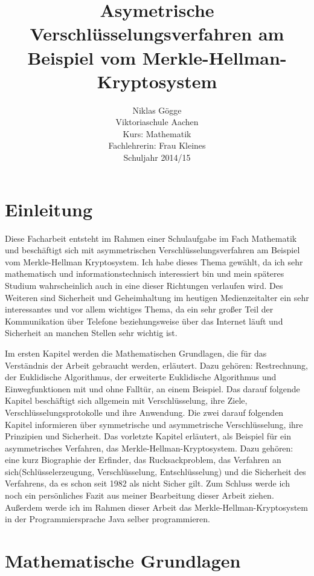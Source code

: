 \documentclass[a4paper,12pt,titlepage]{article}
\author
{
Niklas Gögge\\
Viktoriaschule Aachen\\
Kurs: Mathematik\\
Fachlehrerin: Frau Kleines\\
Schuljahr 2014/15
}
\begin{document}
\title{Asymetrische Verschlüsselungsverfahren am Beispiel vom Merkle-Hellman-Kryptosystem}
\maketitle

\newpage
\tableofcontents
\newpage

\section{Einleitung}
Diese Facharbeit entsteht im Rahmen einer Schulaufgabe im Fach Mathematik und
beschäftigt sich mit asymmetrischen Verschlüsselungsverfahren am Beispiel vom
Merkle-Hellman Kryptosystem. Ich habe dieses Thema gewählt, da ich sehr
mathematisch und informationstechnisch interessiert bin und mein späteres
Studium wahrscheinlich auch in eine dieser Richtungen verlaufen wird. Des
Weiteren sind Sicherheit und Geheimhaltung im heutigen Medienzeitalter ein sehr
interessantes und vor allem wichtiges Thema, da ein sehr großer Teil der
Kommunikation über Telefone beziehungsweise über das Internet läuft und
Sicherheit an manchen Stellen sehr wichtig ist.

Im ersten Kapitel werden die Mathematischen Grundlagen, die für das Verständnis
der Arbeit gebraucht werden, erläutert. Dazu gehören: Restrechnung, der Euklidische
Algorithmus, der erweiterte Euklidische Algorithmus und Einwegfunktionen mit
und ohne Falltür, an einem Beispiel. Das darauf folgende Kapitel beschäftigt
sich allgemein mit Verschlüsselung, ihre Ziele, Verschlüsselungsprotokolle und
ihre Anwendung. Die zwei darauf folgenden Kapitel informieren über symmetrische
und asymmetrische Verschlüsselung, ihre Prinzipien und Sicherheit. Das
vorletzte Kapitel erläutert, als Beispiel für ein asymmetrisches Verfahren, das
Merkle-Hellman-Kryptosystem. Dazu gehören: eine kurz Biographie der Erfinder,
das Rucksackproblem, das Verfahren an sich(Schlüsselerzeugung, Verschlüsselung,
Entschlüsselung) und die Sicherheit des Verfahrens, da es schon seit 1982 als
nicht Sicher gilt. Zum Schluss werde ich noch ein persönliches Fazit aus meiner
Bearbeitung dieser Arbeit ziehen. Außerdem werde ich im Rahmen dieser Arbeit
das Merkle-Hellman-Kryptosystem in der Programmiersprache Java selber
programmieren.  \newpage

\section{Mathematische Grundlagen}
\end{document}
